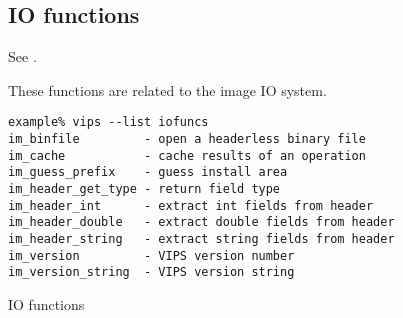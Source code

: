 \subsection{IO functions}

See .

These functions are related to the image IO system. 

\begin{fig2}
\begin{verbatim}
example% vips --list iofuncs
im_binfile         - open a headerless binary file
im_cache           - cache results of an operation
im_guess_prefix    - guess install area
im_header_get_type - return field type
im_header_int      - extract int fields from header
im_header_double   - extract double fields from header
im_header_string   - extract string fields from header
im_version         - VIPS version number
im_version_string  - VIPS version string
\end{verbatim}
\caption{IO functions}
\label{fg:io}
\end{fig2}

